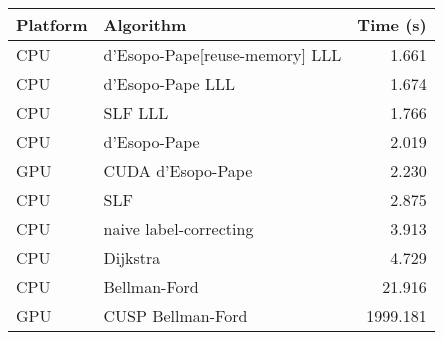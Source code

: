 \begin{tabular}{llr}
  \hline
  Platform & Algorithm & Time (s) \\
  \hline
  CPU & d'Esopo-Pape[reuse-memory] LLL & 1.661 \\
  CPU & d'Esopo-Pape LLL & 1.674 \\
  CPU & SLF LLL & 1.766 \\
  CPU & d'Esopo-Pape & 2.019 \\
  GPU & CUDA d'Esopo-Pape & 2.230 \\
  CPU & SLF & 2.875 \\
  CPU & naive label-correcting & 3.913 \\
  CPU & Dijkstra & 4.729 \\
  CPU & Bellman-Ford & 21.916 \\
  GPU & CUSP Bellman-Ford & 1999.181 \\
  \hline
\end{tabular}
